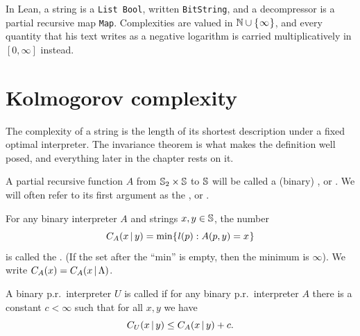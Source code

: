 In Lean, a string is a \texttt{List Bool}, written \texttt{BitString}, and a decompressor
is a partial recursive map \texttt{Map}. Complexities are valued in $\mathbb{N} \cup \mathopen\{\mskip 1mu\infty\mskip 1mu\mathclose\}$,
and every quantity that his text writes as a negative logarithm is carried multiplicatively
in $[0,\infty]$ instead.



\section{Kolmogorov complexity }
The complexity of a string is the length of its shortest description under a fixed
optimal interpreter. The invariance theorem is what makes the definition well posed, and
everything later in the chapter rests on it.


 \begin{definition}
  \label{def:interpreter}
  \leanok
A partial recursive 
function \( A \) from \( \mathbb{S}_{2} \times \mathbb{S} \) to \( \mathbb{S} \) will be called a (binary)
, or . 
We will often refer to its first argument as the , or . 
 \end{definition}

 \begin{definition}
  \label{def:complexity}
  \leanok
For any binary interpreter \( A \) and strings \( x,y \in \mathbb{S} \), the number
 \[
   C_A(x \,\vert\, y) = \min \mathopen\{\mskip 1mu l(p) : A(p,y) = x \mskip 1mu\mathclose\}
 \] 
is called the . 
(If the set after the ``min'' is empty, then the minimum is \( \infty \)). 
We write  \( C_A(x)=C_A(x \,\vert\, \Lambda) \).  
 \end{definition}

 \begin{definition}
  \label{def:optimal}
  \leanok
A binary p.r.~interpreter \( U \) is called 
if for any binary p.r.~interpreter \( A \) there is a constant \( c < \infty \) such that 
for all \( x,y \) we have
 \begin{equation}  
C_U(x \,\vert\, y) \le C_A(x \,\vert\, y) + c. \label{eq:opt}
 \end{equation}
 \end{definition}

